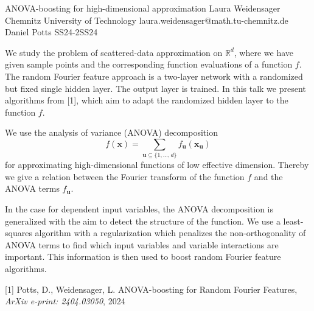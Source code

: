 \begin{talk}
  {ANOVA-boosting for high-dimensional approximation}%
  {Laura Weidensager}%
  {Chemnitz University of Technology}%
  {laura.weidensager@math.tu-chemnitz.de}%
  {Daniel Potts}%
{}{}{SS24-2}{SS24}


				
				
We study the problem of scattered-data approximation on $\mathbb{R}^d$, where we have given sample points and the corresponding function evaluations of a function $f$. The random Fourier feature approach is a two-layer network with a randomized but fixed single hidden layer. The output layer is trained. In this talk we present algorithms from [1], which aim to adapt the randomized hidden layer to the function $f$.\par
We use the analysis of variance (ANOVA) decomposition 
$$f(\mathbf{ x}) = \sum_{\mathbf{ u}\subseteq \{1,\ldots, d\}} f_{\mathbf{ u}}(\mathbf{ x}_{\mathbf{\mathbf{ u}}})$$
for approximating high-dimensional functions of low effective dimension. Thereby we give a relation between the Fourier transform of the function $f$ and the ANOVA terms $f_{\mathbf{u}}$. \par
In the case for dependent input variables, the ANOVA decomposition is generalized with the aim to detect the structure of the function. We use a least-squares algorithm with a regularization which penalizes the non-orthogonality of ANOVA terms to find which input variables and variable interactions are important. This information is then used to boost random Fourier feature algorithms. 

\medskip

[1] Potts, D., Weidensager, L. ANOVA-boosting for Random Fourier Features, \textit{ArXiv e-print: 2404.03050}, 2024\\
\end{talk}

